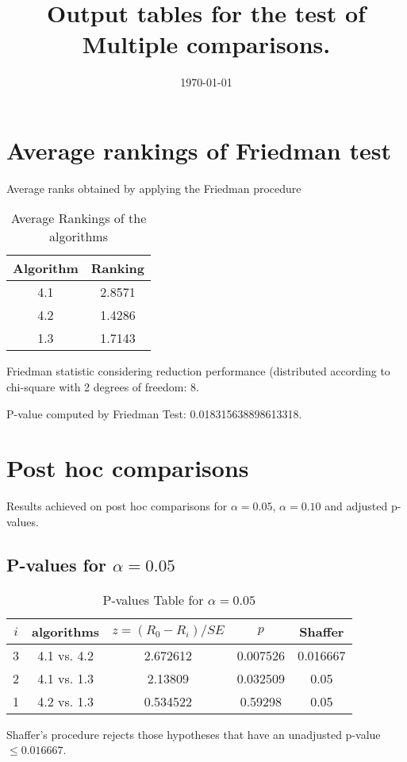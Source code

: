 \documentclass[a4paper,10pt]{article}
\title{Output tables for the test of Multiple comparisons.}
\author{}
\date{\today}
\begin{document}
\begin{landscape}
\pagestyle{empty}
\maketitle
\thispagestyle{empty}
\section{Average rankings of Friedman test}



Average ranks obtained by applying the Friedman procedure

\begin{table}[!htp]
\centering
\begin{tabular}{|c|c|}\hline
Algorithm&Ranking\\\hline
4.1 & 2.8571\\
4.2 & 1.4286\\
1.3 & 1.7143\\
\hline
\end{tabular}
\caption{Average Rankings of the algorithms}
\end{table}

Friedman statistic considering reduction performance (distributed according to chi-square with 2 degrees of freedom: 8.

P-value computed by Friedman Test: 0.018315638898613318.\newline



\pagebreak

\section{Post hoc comparisons}

Results achieved on post hoc comparisons for $\alpha = 0.05$, $\alpha = 0.10$ and adjusted p-values.

\subsection{P-values for $\alpha=0.05$}

\begin{table}[!htp]
\centering\scriptsize
\begin{tabular}{ccccc}
$i$&algorithms&$z=(R_0 - R_i)/SE$&$p$&Shaffer\\
\hline3&4.1 vs. 4.2&2.672612&0.007526&0.016667\\
2&4.1 vs. 1.3&2.13809&0.032509&0.05\\
1&4.2 vs. 1.3&0.534522&0.59298&0.05\\
\hline
\end{tabular}
\caption{P-values Table for $\alpha=0.05$}
\end{table}Shaffer's procedure rejects those hypotheses that have an unadjusted p-value $\le0.016667$.


\end{landscape}
\end{document}
